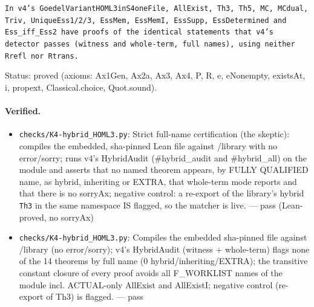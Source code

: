\documentclass{article}
\begin{document}
\texttt{In v4's GoedelVariantHOML3inS4oneFile, AllExist, Th3, Th5, MC, MCdual, Triv, UniqueEss1/2/3, EssMem, EssMemI, EssSupp, EssDetermined and Ess\_iff\_Ess2 have proofs of the identical statements that v4's detector passes (witness and whole-term, full names), using neither Rrefl nor Rtrans.}

Status: proved (axioms: Ax1Gen, Ax2a, Ax3, Ax4, P, R, e, eNonempty, existsAt, i, propext, Classical.choice, Quot.sound).

\paragraph{Verified.}
\begin{itemize}
\item \texttt{checks/K4-hybrid\_HOML3.py}: Strict full-name certification (the skeptic): compiles the embedded, sha-pinned Lean file against /library with no error/sorry; runs v4's HybridAudit (\#hybrid\_audit and \#hybrid\_all) on the module and asserts that no named theorem appears, by FULLY QUALIFIED name, as hybrid, inheriting or EXTRA, that whole-term mode reports and that there is no sorryAx; negative control: a re-export of the library's hybrid \texttt{Th3} in the same namespace IS flagged, so the matcher is live. --- pass (Lean-proved, no sorryAx)
\item \texttt{checks/K4-hybrid\_HOML3.py}: Compiles the embedded sha-pinned file against /library (no error/sorry); v4's HybridAudit (witness + whole-term) flags none of the 14 theorems by full name (0 hybrid/inheriting/EXTRA); the transitive constant closure of every proof avoids all F\_WORKLIST names of the module incl. ACTUAL-only AllExist and AllExistI; negative control (re-export of Th3) is flagged. --- pass
\end{itemize}
\end{document}
